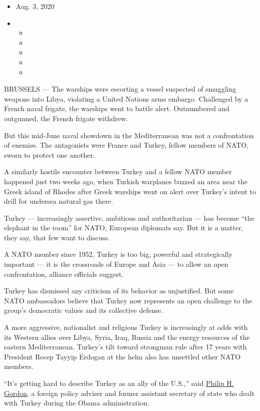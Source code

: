 \begin{itemize}
\item
  Aug. 3, 2020
\item
  \begin{itemize}
  \item
  \item
  \item
  \item
  \item
  \end{itemize}
\end{itemize}

BRUSSELS --- The warships were escorting a vessel suspected of smuggling
weapons into Libya, violating a United Nations arms embargo. Challenged
by a French naval frigate, the warships went to battle alert.
Outnumbered and outgunned, the French frigate withdrew.

But this mid-June naval showdown in the Mediterranean was not a
confrontation of enemies. The antagonists were France and Turkey, fellow
members of NATO, sworn to protect one another.

A similarly hostile encounter between Turkey and a fellow NATO member
happened just two weeks ago, when Turkish warplanes buzzed an area near
the Greek island of Rhodes after Greek warships went on alert over
Turkey's intent to drill for undersea natural gas there.

Turkey --- increasingly assertive, ambitious and authoritarian --- has
become ``the elephant in the room'' for NATO, European diplomats say.
But it is a matter, they say, that few want to discuss.

A NATO member since 1952, Turkey is too big, powerful and strategically
important --- it is the crossroads of Europe and Asia --- to allow an
open confrontation, alliance officials suggest.

Turkey has dismissed any criticism of its behavior as unjustified. But
some NATO ambassadors believe that Turkey now represents an open
challenge to the group's democratic values and its collective defense.

A more aggressive, nationalist and religious Turkey is increasingly at
odds with its Western allies over Libya, Syria, Iraq, Russia and the
energy resources of the eastern Mediterranean. Turkey's tilt toward
strongman rule after 17 years with President Recep Tayyip Erdogan at the
helm also has unsettled other NATO members.

``It's getting hard to describe Turkey as an ally of the U.S.,'' said
\href{https://www.cfr.org/expert/philip-h-gordon}{Philip H. Gordon}, a
foreign policy adviser and former assistant secretary of state who dealt
with Turkey during the Obama administration.


